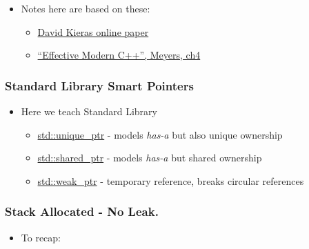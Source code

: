\begin{itemize}
\itemsep1pt\parskip0pt
\item
  Notes here are based on these:

  \begin{itemize}
  \itemsep1pt\parskip0pt
  \item
    \href{http://www.umich.edu/~eecs381/handouts/C++11_smart_ptrs.pdf}{David
    Kieras online paper}
  \item
    \href{https://www.amazon.co.uk/Effective-Modern-Specific-Ways-Improve/dp/1491903996/ref=sr_1_1?ie=UTF8\&qid=1484571499\&sr=8-1\&keywords=Effective+Modern+C\%2B\%2B}{``Effective
    Modern C++'', Meyers, ch4}
  \end{itemize}
\end{itemize}

\subsubsection{Standard Library Smart
Pointers}\label{standard-library-smart-pointers}

\begin{itemize}
\itemsep1pt\parskip0pt
\item
  Here we teach Standard Library

  \begin{itemize}
  \itemsep1pt\parskip0pt
  \item
    \href{http://en.cppreference.com/w/cpp/memory/unique_ptr}{std::unique\_ptr}
    - models \emph{has-a} but also unique ownership
  \item
    \href{http://en.cppreference.com/w/cpp/memory/shared_ptr}{std::shared\_ptr}
    - models \emph{has-a} but shared ownership
  \item
    \href{http://en.cppreference.com/w/cpp/memory/weak_ptr}{std::weak\_ptr}
    - temporary reference, breaks circular references
  \end{itemize}
\end{itemize}

\subsubsection{Stack Allocated - No
Leak.}\label{stack-allocated---no-leak.}

\begin{itemize}
\itemsep1pt\parskip0pt
\item
  To recap:
\end{itemize}

